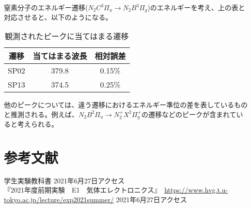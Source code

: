 \documentclass{ltjsarticle}
\begin{document}
窒素分子のエネルギー遷移($N_2C^3\Pi_u \rightarrow N_2B^3\Pi_g$)のエネルギーを考え、上の表と対応させると、以下のようになる。

\begin{table}[H]
    \begin{center}
        \begin{tabular}{|c|c|c|} \hline
            遷移 & 当てはまる波長 & 相対誤差 \\ \hline
            SP02 & 379.8 & 0.15\% \\ \hline
            SP13 & 374.5 & 0.25\% \\ \hline
        \end{tabular}
        \caption{観測されたピークに当てはまる遷移}
    \end{center}
\end{table}

他のピークについては、違う遷移におけるエネルギー準位の差を表しているものと推測される。例えば、$N_2B^2 \Pi_u \rightarrow N_2^+X^2\Pi_g^+$の遷移などのピークが含まれていると考えられる。



\section{参考文献}
学生実験教科書 2021年6月27日アクセス\\
『2021年度前期実験　E1　気体エレクトロニクス』　\url{https://www.hvg.t.u-tokyo.ac.jp/lecture/exp2021summer/} 2021年6月27日アクセス
\end{document}
